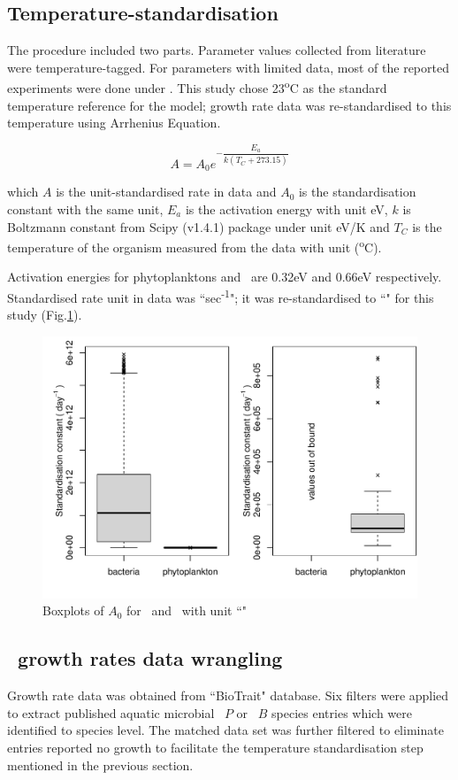 \documentclass[env.tex]{subfiles}
\begin{document}
\subsection{Temperature-standardisation}
The procedure included two parts.  Parameter values collected from literature were temperature-tagged.  For parameters with limited data, most of the reported experiments were done under \temp.  This study chose 23\textsuperscript{o}C as the standard temperature reference for the model; growth rate data was re-standardised to this temperature using Arrhenius Equation.

\begin{equation}
    A = A_0e^{-\dfrac{E_a}{k(T_C+273.15)}}
    \label{arrEq}
\end{equation}

which $A$ is the unit-standardised rate in data and $A_0$ is the standardisation constant with the same unit, $E_a$ is the activation energy with unit eV, $k$ is Boltzmann constant from Scipy (v1.4.1) package under unit eV/K and $T_C$ is the temperature of the organism measured from the data with unit (\textsuperscript{o}C).

Activation energies for phytoplanktons and \bac\ are 0.32eV and 0.66eV respectively\autocite{regaudie2012temperature}.  Standardised rate unit in data was ``sec\textsuperscript{-1}"; it was re-standardised to ``\dayU" for this study (Fig.\ref{f:A0}).

\begin{figure}[H]
    \centering
    \includegraphics[width=.7\linewidth]{../result/stdCst.pdf}
    \caption[Boxplot of standardised $A_0$]{Boxplots of $A_0$ for \phy\ and \bac\ with unit ``\dayU"}
    \label{f:A0}
\end{figure}

\subsection{\Phy\ growth rates data wrangling}
Growth rate data was obtained from ``BioTrait" database\autocite{della2013thermal}.  Six filters were applied to extract published aquatic microbial \phy\ $P$ or \bac\ $B$ species entries which were identified to species level.  The matched data set was further filtered to eliminate entries reported no growth to facilitate the temperature standardisation step mentioned in the previous section.
\end{document}
